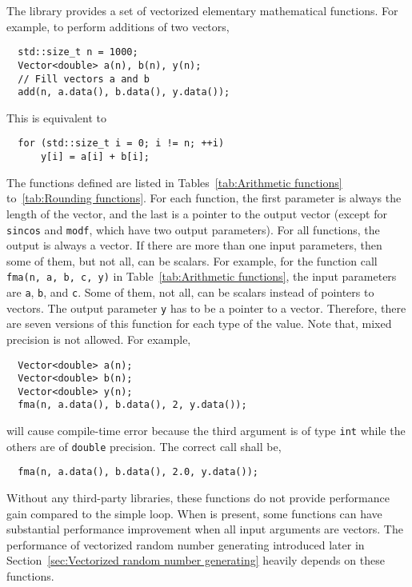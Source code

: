 The library provides a set of vectorized elementary mathematical functions.
For example, to perform additions of two vectors,
\begin{Verbatim}
  std::size_t n = 1000;
  Vector<double> a(n), b(n), y(n);
  // Fill vectors a and b
  add(n, a.data(), b.data(), y.data());
\end{Verbatim}
This is equivalent to
\begin{Verbatim}
  for (std::size_t i = 0; i != n; ++i)
      y[i] = a[i] + b[i];
\end{Verbatim}
The functions defined are listed in Tables~\ref{tab:Arithmetic functions}
to~\ref{tab:Rounding functions}. For each function, the first parameter is
always the length of the vector, and the last is a pointer to the output vector
(except for \verb|sincos| and \verb|modf|, which have two output parameters).
For all functions, the output is always a vector. If there are more than one
input parameters, then some of them, but not all, can be scalars. For example,
for the function call \verb|fma(n, a, b, c, y)| in Table~\ref{tab:Arithmetic
  functions}, the input parameters are \verb|a|, \verb|b|, and \verb|c|. Some
of them, not all, can be scalars instead of pointers to vectors. The output
parameter \verb|y| has to be a pointer to a vector. Therefore, there are seven
versions of this function for each type of the value. Note that, mixed
precision is not allowed. For example,
\begin{Verbatim}
  Vector<double> a(n);
  Vector<double> b(n);
  Vector<double> y(n);
  fma(n, a.data(), b.data(), 2, y.data());
\end{Verbatim}
will cause compile-time error because the third argument is of type \verb|int|
while the others are of \verb|double| precision. The correct call shall be,
\begin{Verbatim}
  fma(n, a.data(), b.data(), 2.0, y.data());
\end{Verbatim}
Without any third-party libraries, these functions do not provide performance
gain compared to the simple loop. When \mkl is present, some functions can have
substantial performance improvement when all input arguments are vectors. The
performance of vectorized random number generating introduced later in
Section~\ref{sec:Vectorized random number generating} heavily depends on these
functions.

